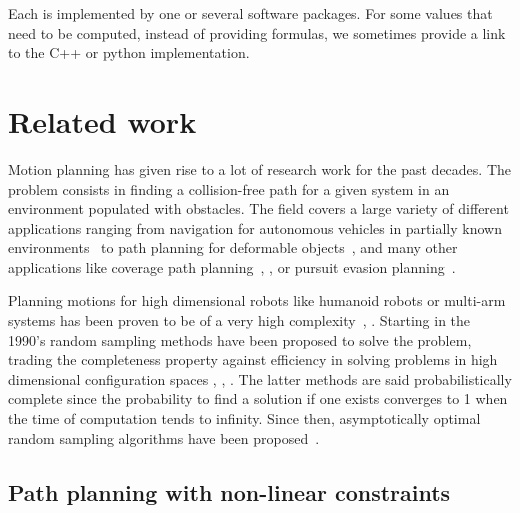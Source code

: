 Each \partie is implemented by one or several software packages. For some values that need to be computed, instead of providing formulas, we sometimes provide a link to the C++ or python implementation.

\section{Related work}\label{sec:related-work}

Motion planning has given rise to a lot of research work for the past decades.
The problem consists in finding a collision-free path for a given system in
an environment populated with obstacles. The field covers a large variety of
different applications ranging from navigation for autonomous vehicles in
partially known environments~\cite{DarpaUrbanChallenge} to path planning for
deformable objects~\cite{LamKav2001}, \cite{RouFerTai2020} and many other applications like coverage path planning~\cite{coverage2001}, \cite{coverage2013}, or pursuit evasion planning~\cite{pursuit-evasion1999}.

Planning motions for high dimensional robots like humanoid robots or multi-arm
systems has been proven to be of a very high complexity~\cite{SchSha1983}, \cite{Canny1983}. Starting in the 1990's random sampling methods have been proposed
to solve the problem, trading the completeness property against efficiency in
solving problems in high dimensional configuration spaces \cite{KSLO1996}, \cite{HsuLatMot99}, \cite{KufLav00}. The latter methods are said probabilistically complete since the probability to find a solution if one exists converges to 1 when the time of computation tends to infinity. Since then, asymptotically optimal random sampling algorithms have
been proposed~\cite{KarFra2011}.

\subsection{Path planning with non-linear constraints}

